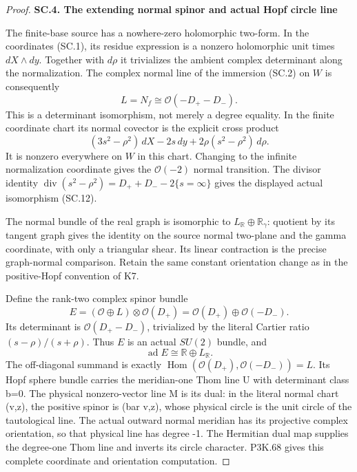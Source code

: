\begin{proof}
\par

\medskip\noindent\textbf{SC.4. The extending normal spinor and actual Hopf circle line}

\par\nobreak

The finite-base source has a nowhere-zero holomorphic two-form. In the
coordinates (SC.1), its residue expression is a nonzero holomorphic
unit times \(dX\wedge dy\). Together with \(d\rho\) it trivializes the
ambient complex determinant along the normalization. The complex normal
line of the immersion (SC.2) on \(W\) is consequently
\[
 L=N_f\cong\mathcal O(-D_+-D_-).                     \tag{SC.12}
\]
This is a determinant isomorphism, not merely a degree equality. In the
finite coordinate chart its normal covector is the explicit cross product
\[
 (3s^2-\rho^2)\,dX-2s\,dy
                    +2\rho(s^2-\rho^2)\,d\rho.     \tag{SC.13}
\]
It is nonzero everywhere on \(W\) in this chart. Changing to the
infinite normalization coordinate gives the \(\mathcal O(-2)\)
normal transition. The divisor identity
\(\operatorname{div}(s^2-\rho^2)=D_++D_--2\{s=\infty\}\)
gives the displayed actual isomorphism (SC.12).

The normal bundle of the real graph is isomorphic to
\(L_{\mathbb R}\oplus\mathbb R_\gamma\): quotient by its tangent
graph gives the identity on the source normal two-plane and the gamma
coordinate, with only a triangular shear. Its linear contraction is
the precise graph-normal comparison. Retain the same constant orientation
change as in the positive-Hopf convention of K7.

Define the rank-two complex spinor bundle
\[
 E=(\mathcal O\oplus L)\otimes\mathcal O(D_+)
       =\mathcal O(D_+)\oplus\mathcal O(-D_-).        \tag{SC.14}
\]
Its determinant is \(\mathcal O(D_+-D_-)\), trivialized by the literal
Cartier ratio \((s-\rho)/(s+\rho)\). Thus \(E\) is an actual
\(SU(2)\) bundle, and
\[
 \operatorname{ad}E\cong
              \mathbb R\oplus L_{\mathbb R}.        \tag{SC.15}
\]
The off-diagonal summand is exactly
\(\operatorname{Hom}(\mathcal O(D_+),\mathcal O(-D_-))=L\).
Its Hopf sphere bundle carries the meridian-one Thom line U with
determinant class b=0. The physical nonzero-vector line M is its dual:
in the literal normal chart (v,z), the positive spinor is (bar v,z),
whose physical circle is the unit circle of the tautological line.
The actual outward normal meridian has its projective complex orientation,
so that physical line has degree -1. The Hermitian dual map supplies
the degree-one Thom line and inverts its circle character. P3K.68
gives this complete coordinate and orientation computation.


\end{proof}
